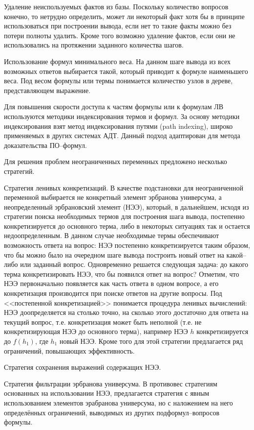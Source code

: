 \documentclass[a4paper]{report}
\begin{document}
Удаление неиспользуемых фактов из базы. Поскольку количество вопросов конечно, то нетрудно определить, может ли некоторый факт хотя бы в принципе использоваться при построении вывода, если нет то такие факты можно без потери полноты удалить. Кроме того возможно удаление фактов, если они не использовались на протяжении заданного количества шагов.

Использование формул минимального веса. На данном шаге вывода из всех возможных ответов выбирается такой, который приводит к формуле наименьшего веса. Под весом формулы или термы понимается количество узлов в дереве, представляющем выражение.

Для повышения скорости доступа к частям формулы или к формулам ЛВ используются методики индексирования термов и формул. За основу методики индексирования взят метод индексирования путями (path indexing), широко применяемых в других системах АДТ. Данный подход адаптирован для метода доказательства ПО--формул.

Для решения проблем неограниченных переменных предложено несколько стратегий.

Стратегия ленивых конкретизаций. В качестве подстановки для неограниченной переменной выбирается не конкретный элемент эрбранова универсума, а неопределенный эрбрановский элемент (НЭЭ), который, в дальнейшем, исходя из стратегии поиска необходимых термов для построения шага вывода, постепенно конкретизируется до основного терма, либо в некоторых ситуациях так и остается недоопределенным. В данном случае необходимые термы обеспечивают возможность ответа на вопрос: НЭЭ постепенно конкретизируется таким образом, что бы можно было на очередном шаге вывода построить новый ответ на какой--либо или заданный вопрос. Одновременно решается следующая задача: до какого терма конкретизировать НЭЭ, что бы появился ответ на вопрос? Отметим, что НЭЭ первоначально появляется как часть ответа в одном вопросе, а его конкретизация производится при поиске ответов на другие вопросы. Под <<постепенной конкретизацией>> понимается процедура ленивых вычислений: НЭЭ доопределяется на столько точно, на сколько этого достаточно для ответа на текущий вопрос, т.е. конкретизация может быть неполной (т.е. не конкретизирующая НЭЭ до основного терма), например НЭЭ $h$ конкретизируется до $f(h_1)$, где $h_1$ новый НЭЭ. Кроме того для этой стратегии предлагается ряд ограничений, повышающих эффективность.

Стратегия сохранения выражений содержащих НЭЭ.

Стратегия фильтрации эрбранова универсума. В противовес стратегиям основанных на использовании НЭЭ, предлагается стратегия с явным использованием элементов эрабранова универсума, но с наложением на него определённых ограничений, выводимых из других подформул--вопросов формулы.
\end{document}
